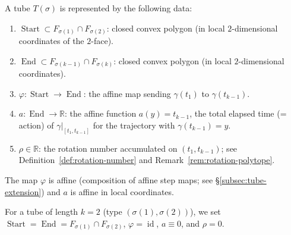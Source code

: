 \begin{definition}\label{def:tube-data}
A tube $T(\sigma)$ is represented by the following data:
\begin{enumerate}
\item $\operatorname{Start} \subset F_{\sigma(1)} \cap F_{\sigma(2)}$:
  closed convex polygon (in local $2$-dimensional coordinates of the $2$-face).
\item $\operatorname{End} \subset F_{\sigma(k-1)} \cap F_{\sigma(k)}$:
  closed convex polygon (in local $2$-dimensional coordinates).
\item $\varphi \colon \operatorname{Start} \to \operatorname{End}$:
  the affine map sending $\gamma(t_1)$ to $\gamma(t_{k-1})$.
\item $a \colon \operatorname{End} \to \mathbb{R}$:
  the affine function $a(y) = t_{k-1}$,
  the total elapsed time (= action) of $\gamma|_{[t_1, t_{k-1}]}$
  for the trajectory with $\gamma(t_{k-1}) = y$.
\item $\rho \in \mathbb{R}$:
  the rotation number accumulated on $(t_1, t_{k-1})$;
  see Definition~\ref{def:rotation-number} and Remark~\ref{rem:rotation-polytope}.
\end{enumerate}
The map $\varphi$ is affine (composition of affine step maps; see §\ref{subsec:tube-extension})
and $a$ is affine in local coordinates.
\end{definition}

\begin{remark}[Initialization for $k = 2$]\label{rem:tube-init}
For a tube of length $k = 2$ (type $(\sigma(1), \sigma(2))$),
we set $\operatorname{Start} = \operatorname{End} = F_{\sigma(1)} \cap F_{\sigma(2)}$,
$\varphi = \operatorname{id}$, $a \equiv 0$, and $\rho = 0$.
\end{remark}

